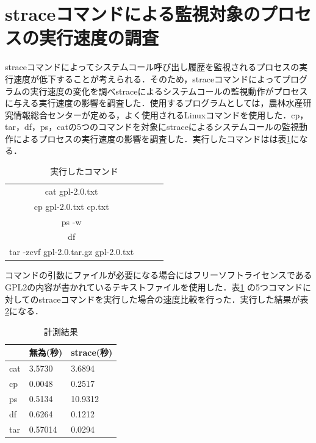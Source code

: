 \section{straceコマンドによる監視対象のプロセスの実行速度の調査}

straceコマンドによってシステムコール呼び出し履歴を監視されるプロセスの実行速度が低下することが考えられる．そのため，straceコマンドによってプログラムの実行速度の変化を調べstraceによるシステムコールの監視動作がプロセスに与える実行速度の影響を調査した．使用するプログラムとしては，農林水産研究情報総合センターが定める，よく使用されるLinuxコマンド\cite{Linux}を使用した．cp，tar，df，ps，catの5つのコマンドを対象にstraceによるシステムコールの監視動作によるプロセスの実行速度の影響を調査した．実行したコマンドはは表\ref{tab:command}になる．
\begin{table}[h]
   \caption{実行したコマンド}
   \label{tab:command}
   \centering
    \begin{tabular}{clll}
     \hline
     \hline
     cat gpl-2.0.txt \\
     cp gpl-2.0.txt cp.txt \\
     ps -w \\
     df \\
     tar -zcvf gpl-2.0.tar.gz gpl-2.0.txt \\
     \hline
    \end{tabular}
\end{table}

コマンドの引数にファイルが必要になる場合にはフリーソフトライセンスであるGPL2の内容が書かれているテキストファイルを使用した．表\ref{tab:command}%
の5つコマンドに対してのstraceコマンドを実行した場合の速度比較を行った．実行した結果が表\ref{tab:strace_result}になる．

\begin{table}[h]
   \caption{計測結果} 
   \label{tab:strace_result}
   \centering
  \begin{tabular}{|l|l|l|}
   \hline
   \multicolumn{1}{|c|}{} & 無為(秒)   & strace(秒) \\ \hline
   cat                    & 3.5730  & 3.6894    \\ \hline
   cp                     & 0.0048  & 0.2517    \\ \hline
   ps                     & 0.5134  & 10.9312   \\ \hline
   df                     & 0.6264  & 0.1212    \\ \hline
   tar                    & 0.57014 & 0.0294    \\ \hline
   \end{tabular}
\end{table}

